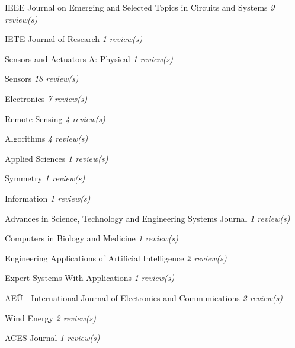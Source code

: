 {\begin{cvitems}
    \item {IEEE Journal on Emerging and Selected Topics in Circuits and Systems \hfill \bodyfontlight\slshape\color{awesome} 9 review(s)}
    \item {IETE Journal of Research \hfill \bodyfontlight\slshape\color{awesome} 1 review(s)}
    \item {Sensors and Actuators A: Physical \hfill \bodyfontlight\slshape\color{awesome} 1 review(s)}
    \item {Sensors \hfill \bodyfontlight\slshape\color{awesome} 18 review(s)}
    \item {Electronics \hfill \bodyfontlight\slshape\color{awesome} 7 review(s)}
    \item {Remote Sensing \hfill \bodyfontlight\slshape\color{awesome} 4 review(s)}
    \item {Algorithms \hfill \bodyfontlight\slshape\color{awesome} 4 review(s)}
    \item {Applied Sciences \hfill \bodyfontlight\slshape\color{awesome} 1 review(s)}
    \item {Symmetry \hfill \bodyfontlight\slshape\color{awesome} 1 review(s)}
    \item {Information \hfill \bodyfontlight\slshape\color{awesome} 1 review(s)}
    \item {Advances in Science, Technology and Engineering Systems Journal \hfill \bodyfontlight\slshape\color{awesome} 1 review(s)}
    \item {Computers in Biology and Medicine \hfill \bodyfontlight\slshape\color{awesome} 1 review(s)}
    \item {Engineering Applications of Artificial Intelligence \hfill \bodyfontlight\slshape\color{awesome} 2 review(s)}
    \item {Expert Systems With Applications \hfill \bodyfontlight\slshape\color{awesome} 1 review(s)}
    \item {AEÜ - International Journal of Electronics and Communications \hfill \bodyfontlight\slshape\color{awesome} 2 review(s)}
    \item {Wind Energy \hfill \bodyfontlight\slshape\color{awesome} 2 review(s)}
    \item {ACES Journal \hfill \bodyfontlight\slshape\color{awesome} 1 review(s)}
    
    \vspace{4.0mm}
\end{cvitems}
}


